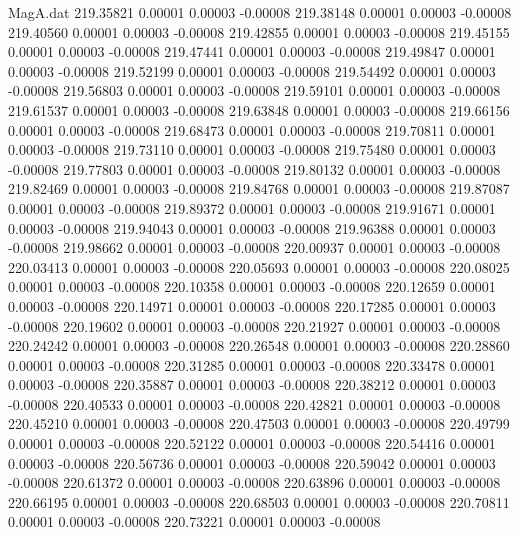 \begin{filecontents}{MagA.dat}
 219.35821    0.00001    0.00003   -0.00008
 219.38148    0.00001    0.00003   -0.00008
 219.40560    0.00001    0.00003   -0.00008
 219.42855    0.00001    0.00003   -0.00008
 219.45155    0.00001    0.00003   -0.00008
 219.47441    0.00001    0.00003   -0.00008
 219.49847    0.00001    0.00003   -0.00008
 219.52199    0.00001    0.00003   -0.00008
 219.54492    0.00001    0.00003   -0.00008
 219.56803    0.00001    0.00003   -0.00008
 219.59101    0.00001    0.00003   -0.00008
 219.61537    0.00001    0.00003   -0.00008
 219.63848    0.00001    0.00003   -0.00008
 219.66156    0.00001    0.00003   -0.00008
 219.68473    0.00001    0.00003   -0.00008
 219.70811    0.00001    0.00003   -0.00008
 219.73110    0.00001    0.00003   -0.00008
 219.75480    0.00001    0.00003   -0.00008
 219.77803    0.00001    0.00003   -0.00008
 219.80132    0.00001    0.00003   -0.00008
 219.82469    0.00001    0.00003   -0.00008
 219.84768    0.00001    0.00003   -0.00008
 219.87087    0.00001    0.00003   -0.00008
 219.89372    0.00001    0.00003   -0.00008
 219.91671    0.00001    0.00003   -0.00008
 219.94043    0.00001    0.00003   -0.00008
 219.96388    0.00001    0.00003   -0.00008
 219.98662    0.00001    0.00003   -0.00008
 220.00937    0.00001    0.00003   -0.00008
 220.03413    0.00001    0.00003   -0.00008
 220.05693    0.00001    0.00003   -0.00008
 220.08025    0.00001    0.00003   -0.00008
 220.10358    0.00001    0.00003   -0.00008
 220.12659    0.00001    0.00003   -0.00008
 220.14971    0.00001    0.00003   -0.00008
 220.17285    0.00001    0.00003   -0.00008
 220.19602    0.00001    0.00003   -0.00008
 220.21927    0.00001    0.00003   -0.00008
 220.24242    0.00001    0.00003   -0.00008
 220.26548    0.00001    0.00003   -0.00008
 220.28860    0.00001    0.00003   -0.00008
 220.31285    0.00001    0.00003   -0.00008
 220.33478    0.00001    0.00003   -0.00008
 220.35887    0.00001    0.00003   -0.00008
 220.38212    0.00001    0.00003   -0.00008
 220.40533    0.00001    0.00003   -0.00008
 220.42821    0.00001    0.00003   -0.00008
 220.45210    0.00001    0.00003   -0.00008
 220.47503    0.00001    0.00003   -0.00008
 220.49799    0.00001    0.00003   -0.00008
 220.52122    0.00001    0.00003   -0.00008
 220.54416    0.00001    0.00003   -0.00008
 220.56736    0.00001    0.00003   -0.00008
 220.59042    0.00001    0.00003   -0.00008
 220.61372    0.00001    0.00003   -0.00008
 220.63896    0.00001    0.00003   -0.00008
 220.66195    0.00001    0.00003   -0.00008
 220.68503    0.00001    0.00003   -0.00008
 220.70811    0.00001    0.00003   -0.00008
 220.73221    0.00001    0.00003   -0.00008

\end{filecontents}

